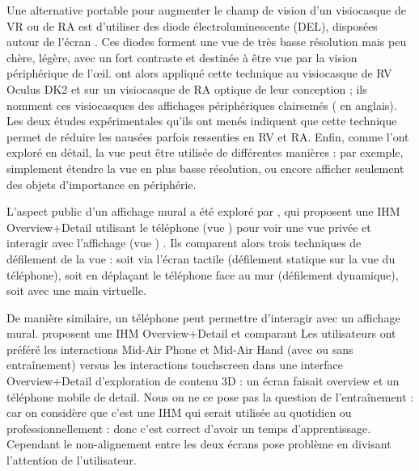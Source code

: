 Une alternative portable pour augmenter le champ de vision d'un visiocasque de VR ou de RA est d'utiliser des diode électroluminescente (DEL), disposées autour de l'écran . Ces diodes forment une vue  de très basse résolution mais peu chère, légère, avec un fort contraste et destinée à être vue par la vision périphérique de l'\oe il. \cite{Xiao2016} ont alors appliqué cette technique au visiocasque de RV Oculus DK2 et sur un visiocasque de RA optique de leur conception ; ils nomment ces visiocasques des affichages périphériques clairsemés ( en anglais). Les deux études expérimentales qu'ils ont menés indiquent que cette technique permet de réduire les nausées parfois ressenties en RV et RA. Enfin, comme \cite{Jones2013} l'ont exploré en détail, la vue  peut être utilisée de différentes manières : par exemple, simplement étendre la vue  en plus basse résolution, ou encore afficher seulement des objets d'importance en périphérie.


L'aspect public d'un affichage mural a été exploré par \cite{Berge2014}, qui proposent une IHM Overview+Detail utilisant le téléphone (vue ) pour voir une vue privée et interagir avec l'affichage (vue ) . Ils comparent alors trois techniques de défilement de la vue   : soit via l'écran tactile (défilement statique sur la vue du téléphone), soit en déplaçant le téléphone face au mur (défilement dynamique), soit avec une main virtuelle.

De manière similaire, un téléphone peut permettre d'interagir avec un affichage mural. \cite{Berge2014} proposent une IHM Overview+Detail et  comparant Les utilisateurs ont préféré les interactions Mid-Air Phone et Mid-Air Hand (avec ou sans entraînement) versus les interactions touchscreen dans une interface Overview+Detail d'exploration de contenu 3D : un écran faisait overview et un téléphone mobile de detail.
Nous on ne ce pose pas la question de l'entraînement : car on considère que c'est une IHM qui serait utilisée au quotidien ou professionnellement : donc c'est correct d'avoir un temps d'apprentissage.
Cependant le non-alignement entre les deux écrans pose problème en divisant l'attention de l'utilisateur.

